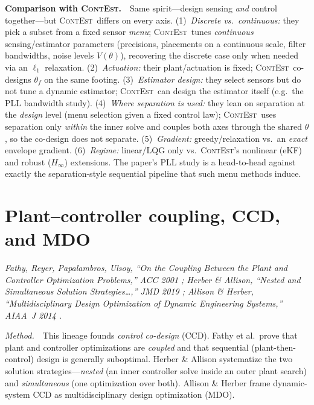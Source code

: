 \documentclass[11pt]{article}
\newcommand{\Th}{\theta}
\newcommand{\ContEst}{\textsc{ContEst}}
\newcommand{\Method}{\smallskip\noindent\textit{Method.}~}
\newcommand{\Versus}{\smallskip\noindent\textbf{Comparison with \ContEst.}~}
\begin{document}
\Versus\ Same spirit---design sensing \emph{and} control together---but \ContEst\
differs on every axis. (1)~\emph{Discrete vs.\ continuous:} they pick a subset
from a fixed sensor \emph{menu}; \ContEst\ tunes \emph{continuous} sensing/estimator
parameters (precisions, placements on a continuous scale, filter bandwidths,
noise levels $V(\Th)$), recovering the discrete case only when needed via an
$\ell_1$ relaxation. (2)~\emph{Actuation:} their plant/actuation is fixed;
\ContEst\ co-designs $\Th_f$ on the same footing. (3)~\emph{Estimator design:}
they select sensors but do not tune a dynamic estimator; \ContEst\ can design the
estimator itself (e.g.\ the PLL bandwidth study). (4)~\emph{Where separation is
used:} they lean on separation at the \emph{design} level (menu selection given a
fixed control law); \ContEst\ uses separation only \emph{within} the inner solve
and couples both axes through the shared $\Th$, so the co-design does not
separate. (5)~\emph{Gradient:} greedy/relaxation vs.\ an \emph{exact} envelope
gradient. (6)~\emph{Regime:} linear/LQG only vs.\ \ContEst's nonlinear (eKF) and
robust ($H_\infty$) extensions. The paper's PLL study is a head-to-head against
exactly the separation-style sequential pipeline that such menu methods induce.

\section{Plant--controller coupling, CCD, and MDO}\label{sec:ccd}
\noindent\emph{Fathy, Reyer, Papalambros, Ulsoy, ``On the Coupling Between the
Plant and Controller Optimization Problems,'' ACC 2001 \cite{fathy2001coupling};
Herber \& Allison, ``Nested and Simultaneous Solution Strategies\dots,'' JMD 2019
\cite{herber2019nested}; Allison \& Herber, ``Multidisciplinary Design
Optimization of Dynamic Engineering Systems,'' AIAA~J 2014
\cite{allison2014multidisciplinary}.}

\Method\ This lineage founds \emph{control co-design} (CCD). Fathy et al.\ prove
that plant and controller optimizations are \emph{coupled} and that sequential
(plant-then-control) design is generally suboptimal. Herber \& Allison
systematize the two solution strategies---\emph{nested} (an inner controller solve
inside an outer plant search) and \emph{simultaneous} (one optimization over both).
Allison \& Herber frame dynamic-system CCD as multidisciplinary design
optimization (MDO).
\end{document}
